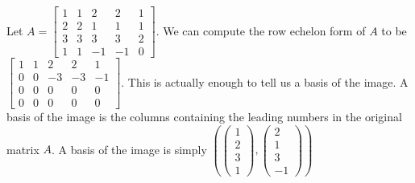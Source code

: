 \begin{example}
    Let $A=\begin{bmatrix}
        1 & 1 & 2 & 2 & 1\\
        2 & 2 & 1 & 1 & 1\\
        3 & 3 & 3 & 3 & 2\\
        1 & 1 & -1 & -1 & 0
    \end{bmatrix}$. We can compute the row echelon form of $A$ to be $\begin{bmatrix}
        1 & 1 & 2 & 2 & 1\\
        0 & 0 & -3 & -3 & -1\\
        0 & 0 & 0 & 0 & 0\\
        0 & 0 & 0 & 0 & 0
    \end{bmatrix}$. This is actually enough to tell us a basis of the image. A basis of the image is the columns containing the leading numbers in the original matrix $A$. A basis of the image is simply $\left(\begin{pmatrix}
        1 \\ 2 \\ 3 \\ 1
    \end{pmatrix}, \begin{pmatrix}
        2 \\ 1 \\ 3 \\ -1
    \end{pmatrix}\right)$
    
\end{example}